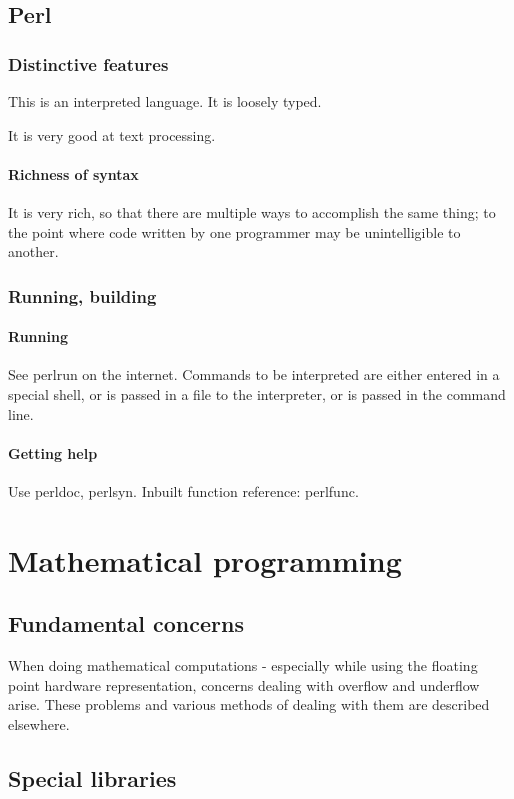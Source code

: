 \documentclass[oneside, article]{memoir}
\begin{document}
\chapter{Perl}
\section{Distinctive features}
This is an interpreted language. It is loosely typed.

It is very good at text processing.

\subsection{Richness of syntax}
It is very rich, so that there are multiple ways to accomplish the same thing; to the point where code written by one programmer may be unintelligible to another.

\section{Running, building}
\subsection{Running}
See perlrun on the internet. Commands to be interpreted are either entered in a special shell, or is passed in a file to the interpreter, or is passed in the command line.

\subsection{Getting help}
Use perldoc, perlsyn. Inbuilt function reference: perlfunc.

\part{Mathematical programming}
\chapter{Fundamental concerns}
When doing mathematical computations - especially while using the floating point hardware representation, concerns dealing with overflow and underflow arise. These problems and various methods of dealing with them are described elsewhere.

\chapter{Special libraries}
\end{document}
